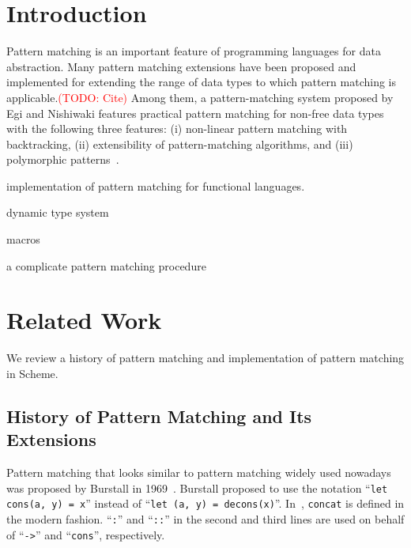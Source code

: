 \documentclass[acmlarge]{acmart}
\newcommand{\todo}[1]{\textcolor{red}{(TODO: #1)}}
\begin{document}


\maketitle

\section{Introduction}\label{intro}

Pattern matching is an important feature of programming languages for data abstraction.
Many pattern matching extensions have been proposed and implemented for extending the range of data types to which pattern matching is applicable.\todo{Cite}
Among them, a pattern-matching system proposed by Egi and Nishiwaki features practical pattern matching for non-free data types with the following three features: (i) non-linear pattern matching with backtracking, (ii) extensibility of pattern-matching algorithms, and (iii) polymorphic patterns~\cite{egi2018aplas}.

implementation of pattern matching for functional languages.

dynamic type system

macros

a complicate pattern matching procedure

\cite{egisonScheme}

\section{Related Work}\label{history}

We review a history of pattern matching and implementation of pattern matching in Scheme.

\subsection{History of Pattern Matching and Its Extensions}\label{history1}

Pattern matching that looks similar to pattern matching widely used nowadays was proposed by Burstall in 1969~\cite{burstall1969proving}.
Burstall proposed to use the notation ``\texttt{let cons(a, y) = x}'' instead of ``\texttt{let (a, y) = decons(x)}''.
In~\cite{burstall1969proving}, \texttt{concat} is defined in the modern fashion.
``\texttt{:}'' and ``\texttt{::}'' in the second and third lines are used on behalf of ``\texttt{->}'' and ``\texttt{cons}'', respectively.
\end{document}
